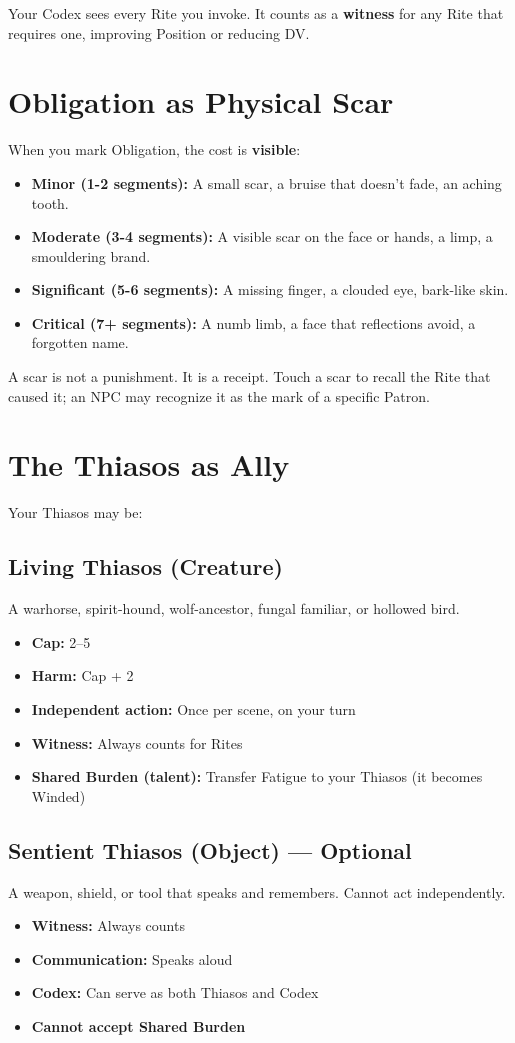 \documentclass[9pt,a5paper]{extbook}
\begin{document}
Your Codex sees every Rite you invoke. It counts as a \textbf{witness} for any Rite that requires one, improving Position or reducing DV.

\section{Obligation as Physical Scar}

When you mark Obligation, the cost is \textbf{visible}:
\begin{itemize}
    \item \textbf{Minor (1-2 segments):} A small scar, a bruise that doesn't fade, an aching tooth.
    \item \textbf{Moderate (3-4 segments):} A visible scar on the face or hands, a limp, a smouldering brand.
    \item \textbf{Significant (5-6 segments):} A missing finger, a clouded eye, bark-like skin.
    \item \textbf{Critical (7+ segments):} A numb limb, a face that reflections avoid, a forgotten name.
\end{itemize}

A scar is not a punishment. It is a receipt. Touch a scar to recall the Rite that caused it; an NPC may recognize it as the mark of a specific Patron.

\section{The Thiasos as Ally}

Your Thiasos may be:

\subsection*{Living Thiasos (Creature)}
A warhorse, spirit-hound, wolf-ancestor, fungal familiar, or hollowed bird.
\begin{itemize}
    \item \textbf{Cap:} 2--5
    \item \textbf{Harm:} Cap + 2
    \item \textbf{Independent action:} Once per scene, on your turn
    \item \textbf{Witness:} Always counts for Rites
    \item \textbf{Shared Burden (talent):} Transfer Fatigue to your Thiasos (it becomes Winded)
\end{itemize}

\subsection*{Sentient Thiasos (Object) --- Optional}
A weapon, shield, or tool that speaks and remembers. Cannot act independently.
\begin{itemize}
    \item \textbf{Witness:} Always counts
    \item \textbf{Communication:} Speaks aloud
    \item \textbf{Codex:} Can serve as both Thiasos and Codex
    \item \textbf{Cannot accept Shared Burden}
\end{itemize}
\end{document}
